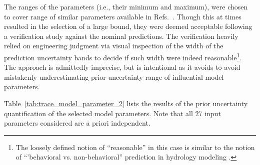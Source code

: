 The ranges of the parameters (i.e., their minimum and maximum), were chosen to cover range of similar parameters available in Refs.~\cite{Wickett1991,Glaeser2008a}.
Though this at times resulted in the selection of a large bound, they were deemed acceptable following a verification study against the nominal predictions.
The verification heavily relied on engineering judgment via visual inspection of the width of the prediction uncertainty bands to decide if such width were indeed reasonable\footnote{The loosely defined notion of ``reasonable'' in this case is similar to the notion of ``'behavioral vs. non-behavioral'' prediction in hydrology modeling \cite{Beven2009}.}.
The approach is admittedly imprecise, but is intentional as it avoids to avoid mistakenly underestimating prior uncertainty range of influential model parameters. 

%
Table~\ref{tab:trace_model_parameter_2} lists the results of the prior uncertainty quantification of the selected model parameters.
Note that all $27$ input parameters considered are a priori independent.
